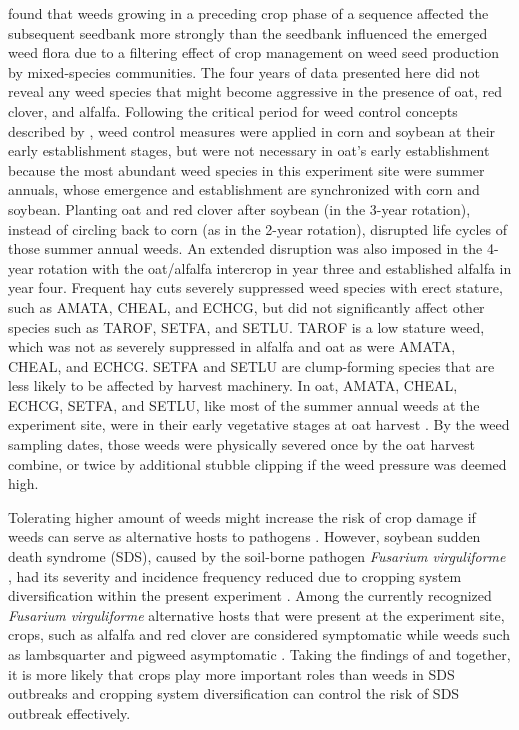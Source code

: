 \documentclass[
]{article}
\begin{document}
\citet{ryanManagementFiltersSpecies2010} found that weeds growing in a preceding crop phase of a sequence affected the subsequent seedbank more strongly than the seedbank influenced the emerged weed flora due to a filtering effect of crop management on weed seed production by mixed-species communities. The four years of data presented here did not reveal any weed species that might become aggressive in the presence of oat, red clover, and alfalfa. Following the critical period for weed control concepts described by \citet{knezevicCriticalPeriodWeed2002}, weed control measures were applied in corn and soybean at their early establishment stages, but were not necessary in oat's early establishment because the most abundant weed species in this experiment site were summer annuals, whose emergence and establishment are synchronized with corn and soybean. Planting oat and red clover after soybean (in the 3-year rotation), instead of circling back to corn (as in the 2-year rotation), disrupted life cycles of those summer annual weeds. An extended disruption was also imposed in the 4-year rotation with the oat/alfalfa intercrop in year three and established alfalfa in year four. Frequent hay cuts severely suppressed weed species with erect stature, such as AMATA, CHEAL, and ECHCG, but did not significantly affect other species such as TAROF, SETFA, and SETLU. TAROF is a low stature weed, which was not as severely suppressed in alfalfa and oat as were AMATA, CHEAL, and ECHCG. SETFA and SETLU are clump-forming species that are less likely to be affected by harvest machinery. In oat, AMATA, CHEAL, ECHCG, SETFA, and SETLU, like most of the summer annual weeds at the experiment site, were in their early vegetative stages at oat harvest \citep{buhlerEmergencePersistenceSeed2001, cordeauHowWeedsDiffer2017}. By the weed sampling dates, those weeds were physically severed once by the oat harvest combine, or twice by additional stubble clipping if the weed pressure was deemed high.

Tolerating higher amount of weeds might increase the risk of crop damage if weeds can serve as alternative hosts to pathogens \citep{wislerInteractionsWeedsCultivated2005, mohlerCropDiseasePathogens2009}. However, soybean sudden death syndrome (SDS), caused by the soil-borne pathogen \emph{Fusarium virguliforme} \citep{hartmanResearchAdvancesManagement2015}, had its severity and incidence frequency reduced due to cropping system diversification within the present experiment \citep{leandroCroppingSystemDiversification2018}. Among the currently recognized \emph{Fusarium virguliforme} alternative hosts that were present at the experiment site, crops, such as alfalfa and red clover are considered symptomatic while weeds such as lambsquarter and pigweed asymptomatic \citep{kolanderSymptomaticAsymptomaticHost2012}. Taking the findings of \citet{kolanderSymptomaticAsymptomaticHost2012} and \citet{leandroCroppingSystemDiversification2018} together, it is more likely that crops play more important roles than weeds in SDS outbreaks and cropping system diversification can control the risk of SDS outbreak effectively.
\end{document}
